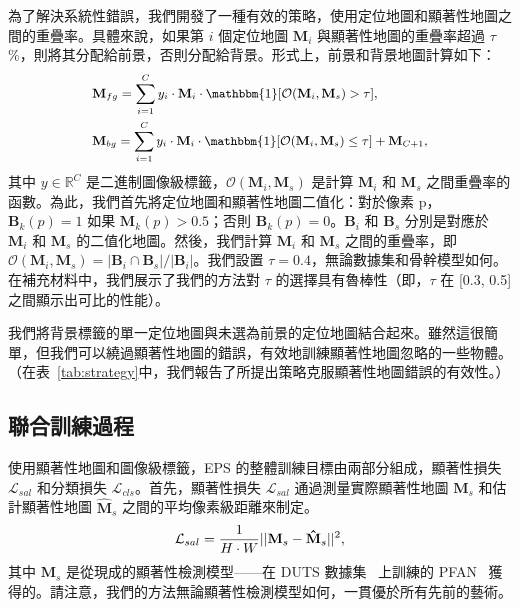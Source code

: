 \documentclass[final]{cvpr}
\begin{document}
為了解決系統性錯誤，我們開發了一種有效的策略，使用定位地圖和顯著性地圖之間的重疊率。具體來說，如果第 $i$ 個定位地圖 $\mathbf{M}_{i}$ 與顯著性地圖的重疊率超過 $\tau$\%，則將其分配給前景，否則分配給背景。形式上，前景和背景地圖計算如下：\vspace{-1mm}
\begin{equation}
\label{eq_map_selection}
{\small
\begin{split}
&\mathbf{M}_{fg} = \sum_{i=1}^{C} {y_{i} \cdot \mathbf{M}_{i} \cdot \mathbbm{1}[\mathcal{O}(\mathbf{M}_i, \mathbf{M}_{s}) > \tau]}, \\
&\mathbf{M}_{bg} = \sum_{i=1}^{C} {y_{i} \cdot \mathbf{M}_{i} \cdot \mathbbm{1}[\mathcal{O}(\mathbf{M}_i, \mathbf{M}_{s}) \le \tau]} + \mathbf{M}_{C+1},
\end{split}}\vspace{-1mm}
\end{equation}
\noindent 其中 $y \in \mathbb{R}^C$ 是二進制圖像級標籤，$\mathcal{O}(\mathbf{M}_i, \mathbf{M}_{s})$ 是計算 $\mathbf{M}_i$ 和 $\mathbf{M}_{s}$ 之間重疊率的函數。為此，我們首先將定位地圖和顯著性地圖二值化：對於像素 p，$\mathbf{B}_{k}(p) = 1$ 如果 $\mathbf{M}_{k}(p) > 0.5$；否則 $\mathbf{B}_{k}(p) = 0$。$\mathbf{B}_{i}$ 和 $\mathbf{B}_{s}$ 分別是對應於 $\mathbf{M}_i$ 和 $\mathbf{M}_{s}$ 的二值化地圖。然後，我們計算 $\mathbf{M}_i$ 和 $\mathbf{M}_{s}$ 之間的重疊率，即 $\mathcal{O}(\mathbf{M}_i ,\mathbf{M}_{s}) = |\mathbf{B}_i \cap \mathbf{B}_{s}| / |\mathbf{B}_{i}|$。我們設置 $\tau=0.4$，無論數據集和骨幹模型如何。在補充材料中，我們展示了我們的方法對 $\tau$ 的選擇具有魯棒性（即，$\tau$ 在 [0.3, 0.5] 之間顯示出可比的性能）。

我們將背景標籤的單一定位地圖與未選為前景的定位地圖結合起來。雖然這很簡單，但我們可以繞過顯著性地圖的錯誤，有效地訓練顯著性地圖忽略的一些物體。（在表~\ref{tab:strategy}中，我們報告了所提出策略克服顯著性地圖錯誤的有效性。）

\subsection{聯合訓練過程}\label{section3.3}

使用顯著性地圖和圖像級標籤，EPS 的整體訓練目標由兩部分組成，顯著性損失 $\mathcal{L}_{sal}$ 和分類損失 $\mathcal{L}_{cls}$。首先，顯著性損失 $\mathcal{L}_{sal}$ 通過測量實際顯著性地圖 $\mathbf{M}_{s}$ 和估計顯著性地圖 $\mathbf{\hat{M}}_{s}$ 之間的平均像素級距離來制定。\vspace{-1mm}
\begin{equation}
{\small
\label{loss_sal}
\mathcal{L}_{sal} = \frac{1}{H\cdot W}||\mathbf{M}_{s}-\mathbf{\hat{M}}_{s}||^{2},
}\vspace{-1mm}
\end{equation}
\noindent 其中 $\mathbf{M}_{s}$ 是從現成的顯著性檢測模型——在 DUTS 數據集~\cite{wang2017learning} 上訓練的 PFAN~\cite{zhao2019pyramid} 獲得的。請注意，我們的方法無論顯著性檢測模型如何，一貫優於所有先前的藝術。
\end{document}
